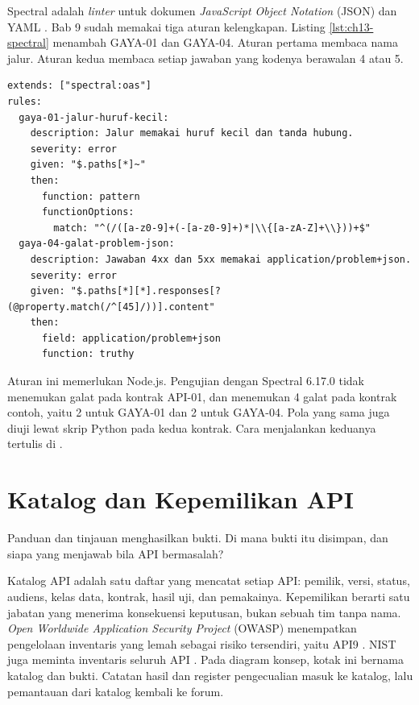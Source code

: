 \begin{pendalaman}[title={Pendalaman Teknis (opsional): Dua Butir Panduan sebagai Aturan Spectral}]
Spectral adalah \textit{linter} untuk dokumen \textit{JavaScript Object Notation} (JSON) dan YAML \cite{spectral}. Bab 9 sudah memakai tiga aturan kelengkapan. Listing \ref{lst:ch13-spectral}
menambah GAYA-01 dan GAYA-04. Aturan pertama membaca nama jalur. Aturan kedua membaca setiap jawaban yang kodenya berawalan 4 atau 5.

\begin{lstlisting}[style=ch13yaml, caption={Aturan GAYA-01 dan GAYA-04, tersedia di \berkas{sources/chapter13/aturan-spectral-gaya.yaml}}, label={lst:ch13-spectral}]
extends: ["spectral:oas"]
rules:
  gaya-01-jalur-huruf-kecil:
    description: Jalur memakai huruf kecil dan tanda hubung.
    severity: error
    given: "$.paths[*]~"
    then:
      function: pattern
      functionOptions:
        match: "^(/([a-z0-9]+(-[a-z0-9]+)*|\\{[a-zA-Z]+\\}))+$"
  gaya-04-galat-problem-json:
    description: Jawaban 4xx dan 5xx memakai application/problem+json.
    severity: error
    given: "$.paths[*][*].responses[?(@property.match(/^[45]/))].content"
    then:
      field: application/problem+json
      function: truthy
\end{lstlisting}

Aturan ini memerlukan Node.js. Pengujian dengan Spectral 6.17.0 tidak menemukan galat pada kontrak API-01, dan menemukan 4 galat pada kontrak contoh, yaitu 2 untuk
GAYA-01 dan 2 untuk GAYA-04. Pola yang sama juga diuji lewat skrip Python pada kedua kontrak. Cara menjalankan keduanya tertulis di .
\end{pendalaman}

\section{Katalog dan Kepemilikan API}

Panduan dan tinjauan menghasilkan bukti. Di mana bukti itu disimpan, dan siapa yang menjawab bila API bermasalah?

Katalog API adalah satu daftar yang mencatat setiap API: pemilik, versi, status, audiens, kelas data, kontrak, hasil uji, dan pemakainya. Kepemilikan berarti satu
jabatan yang menerima konsekuensi keputusan, bukan sebuah tim tanpa nama. \textit{Open Worldwide Application Security Project} (OWASP) menempatkan pengelolaan inventaris yang lemah sebagai risiko tersendiri, yaitu
API9 \cite{owasp-api9}. NIST juga meminta inventaris seluruh API \cite{nist-sp800-228}. Pada diagram konsep, kotak ini bernama katalog dan bukti. Catatan hasil
dan register pengecualian masuk ke katalog, lalu pemantauan dari katalog kembali ke forum.

